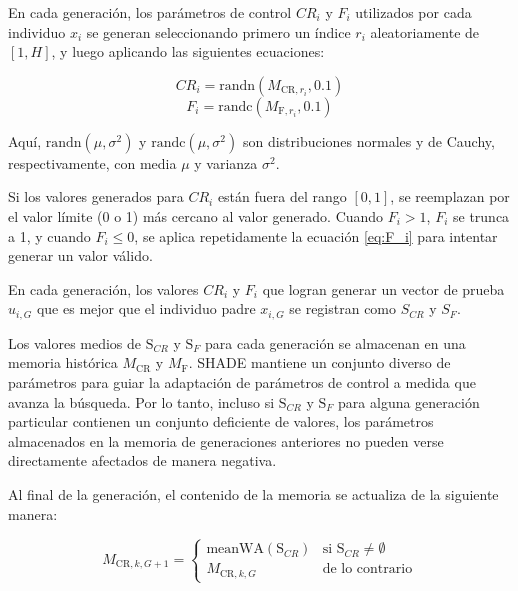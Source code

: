 \noindent En cada generación, los parámetros de control \(CR_i\) y \(F_i\) utilizados por cada individuo \(x_i\) se generan seleccionando primero un índice \(r_i\) aleatoriamente de \([1, H]\), y luego aplicando las siguientes ecuaciones:

\begin{equation}
CR_i = \text{randn}(M_{\text{CR},r_i}, 0.1)
\end{equation}
\begin{equation}
F_i = \text{randc}(M_{\text{F},r_i}, 0.1)
\label{eq:F_i}
\end{equation}

\noindent Aquí, \(\text{randn}(\mu, \sigma^2)\) y \(\text{randc}(\mu, \sigma^2)\) son distribuciones normales y de Cauchy, respectivamente, con media \(\mu\) y varianza \(\sigma^2\).

\noindent Si los valores generados para \(CR_i\) están fuera del rango \([0, 1]\), se reemplazan por el valor límite (0 o 1) más cercano al valor generado. Cuando \(F_i > 1\), \(F_i\) se trunca a 1, y cuando \(F_i \leq 0\), se aplica repetidamente la ecuación \ref{eq:F_i} para intentar generar un valor válido.

\noindent En cada generación, los valores \(CR_i\) y \(F_i\) que logran generar un vector de prueba \(u_{i,G}\) que es mejor que el individuo padre \(x_{i,G}\) se registran como \(S_{CR}\) y \(S_{F}\).

\noindent Los valores medios de \(\text{S}_{CR}\) y \(\text{S}_{F}\) para cada generación se almacenan en una memoria histórica \(M_{\text{CR}}\) y \(M_{\text{F}}\). SHADE mantiene un conjunto diverso de parámetros para guiar la adaptación de parámetros de control a medida que avanza la búsqueda. Por lo tanto, incluso si \(\text{S}_{CR}\) y \(\text{S}_{F}\) para alguna generación particular contienen un conjunto deficiente de valores, los parámetros almacenados en la memoria de generaciones anteriores no pueden verse directamente afectados de manera negativa.

\noindent Al final de la generación, el contenido de la memoria se actualiza de la siguiente manera:

\begin{equation}
M_{\text{CR},k,G+1} =
\begin{cases} 
\text{meanWA}(\text{S}_{CR}) & \text{si } \text{S}_{CR} \neq \emptyset \\
M_{\text{CR},k,G} & \text{de lo contrario}
\end{cases}
\end{equation}

